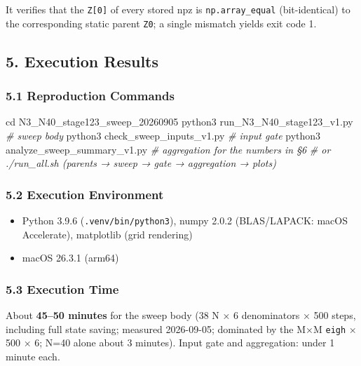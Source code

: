 \documentclass[
  a4paper,
]{ltjsarticle}
\newenvironment{Shaded}{}{}
\newcommand{\BuiltInTok}[1]{\textcolor[rgb]{0.00,0.50,0.00}{#1}}
\newcommand{\CommentTok}[1]{\textcolor[rgb]{0.38,0.63,0.69}{\textit{#1}}}
\newcommand{\ExtensionTok}[1]{#1}
\newcommand{\NormalTok}[1]{#1}
\providecommand{\tightlist}{%
  \setlength{\itemsep}{0pt}\setlength{\parskip}{0pt}}
\begin{document}
It verifies that the \texttt{Z{[}0{]}} of every stored npz is
\texttt{np.array\_equal} (bit-identical) to the corresponding static
parent \texttt{Z0}; a single mismatch yields exit code 1.

\subsection{5. Execution Results}\label{execution-results}

\subsubsection{5.1 Reproduction Commands}\label{reproduction-commands}

\begin{Shaded}
\begin{Highlighting}[]
\BuiltInTok{cd}\NormalTok{ N3\_N40\_stage123\_sweep\_20260905}
\ExtensionTok{python3}\NormalTok{ run\_N3\_N40\_stage123\_v1.py        }\CommentTok{\# sweep body}
\ExtensionTok{python3}\NormalTok{ check\_sweep\_inputs\_v1.py         }\CommentTok{\# input gate}
\ExtensionTok{python3}\NormalTok{ analyze\_sweep\_summary\_v1.py      }\CommentTok{\# aggregation for the numbers in §6}
\CommentTok{\# or ./run\_all.sh (parents → sweep → gate → aggregation → plots)}
\end{Highlighting}
\end{Shaded}

\subsubsection{5.2 Execution Environment}\label{execution-environment}

\begin{itemize}
\tightlist
\item
  Python 3.9.6 (\texttt{.venv/bin/python3}), numpy 2.0.2 (BLAS/LAPACK:
  macOS Accelerate), matplotlib (grid rendering)
\item
  macOS 26.3.1 (arm64)
\end{itemize}

\subsubsection{5.3 Execution Time}\label{execution-time}

About \textbf{45--50 minutes} for the sweep body (38 N × 6 denominators
× 500 steps, including full state saving; measured 2026-09-05; dominated
by the M×M \texttt{eigh} × 500 × 6; N=40 alone about 3 minutes). Input
gate and aggregation: under 1 minute each.
\end{document}
